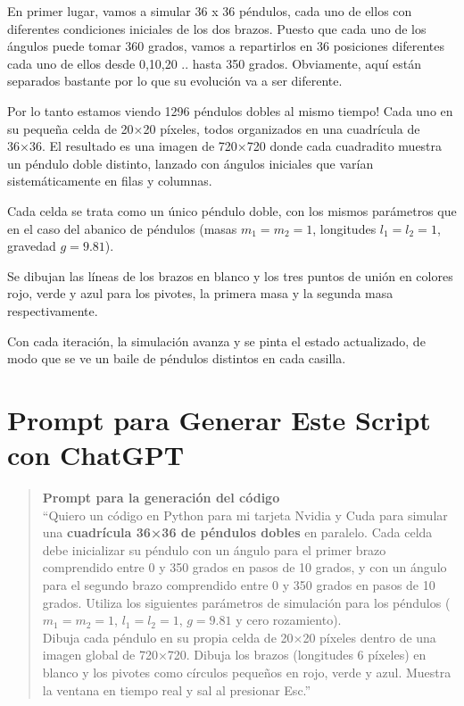 \documentclass[
  10pt,
  a4paper,
  DIV=11,
  numbers=noendperiod,
  open=any]{scrreprt}
\numberwithin{equation}{chapter}
\numberwithin{equation}{section}
\renewcommand{\[}{\begin{equation}}
\renewcommand{\]}{\end{equation}}
\begin{document}
En primer lugar, vamos a simular 36 x 36 péndulos, cada uno de ellos con
diferentes condiciones iniciales de los dos brazos. Puesto que cada uno
de los ángulos puede tomar 360 grados, vamos a repartirlos en 36
posiciones diferentes cada uno de ellos desde 0,10,20 .. hasta 350
grados. Obviamente, aquí están separados bastante por lo que su
evolución va a ser diferente.

Por lo tanto estamos viendo 1296 péndulos dobles al mismo tiempo! Cada
uno en su pequeña celda de 20×20 píxeles, todos organizados en una
cuadrícula de 36×36. El resultado es una imagen de 720×720 donde cada
cuadradito muestra un péndulo doble distinto, lanzado con ángulos
iniciales que varían sistemáticamente en filas y columnas.

Cada celda se trata como un único péndulo doble, con los mismos
parámetros que en el caso del abanico de péndulos (masas \(m_1=m_2=1\),
longitudes \(l_1=l_2=1\), gravedad \(g=9.81\)).

Se dibujan las líneas de los brazos en blanco y los tres puntos de unión
en colores rojo, verde y azul para los pivotes, la primera masa y la
segunda masa respectivamente.

Con cada iteración, la simulación avanza y se pinta el estado
actualizado, de modo que se ve un baile de péndulos distintos en cada
casilla.

\section{Prompt para Generar Este Script con
ChatGPT}\label{prompt-para-generar-este-script-con-chatgpt}

\begin{quote}
\textbf{Prompt para la generación del código}\\
``Quiero un código en Python para mi tarjeta Nvidia y Cuda para simular
una \textbf{cuadrícula 36×36 de péndulos dobles} en paralelo. Cada celda
debe inicializar su péndulo con un ángulo para el primer brazo
comprendido entre 0 y 350 grados en pasos de 10 grados, y con un ángulo
para el segundo brazo comprendido entre 0 y 350 grados en pasos de 10
grados. Utiliza los siguientes parámetros de simulación para los
péndulos (\(m_1 = m_2 = 1\), \(l_1 = l_2 = 1\), \(g = 9.81\) y cero
rozamiento).\\
Dibuja cada péndulo en su propia celda de 20×20 píxeles dentro de una
imagen global de 720×720. Dibuja los brazos (longitudes 6 píxeles) en
blanco y los pivotes como círculos pequeños en rojo, verde y azul.
Muestra la ventana en tiempo real y sal al presionar Esc.''
\end{quote}
\end{document}
